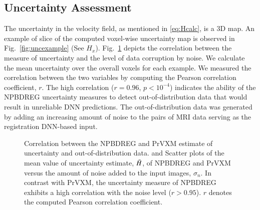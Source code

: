 \documentclass[preprint,authoryear]{elsarticle}
\begin{document}
\subsection{Uncertainty Assessment}
 The uncertainty in the velocity field, as mentioned in \eqref{eq:Hcalc}, is a 3D map. An example of slice of the computed voxel-wise uncertainty map is observed in Fig.~\ref{fig:uncexample} (See $H_x$). Fig.~\ref{fig:unccornoise} depicts the correlation between the measure of uncertainty and the level of data corruption by noise. We calculate the mean uncertainty over the overall voxels for each example. We measured the correlation between the two variables by computing the Pearson correlation coefficient, $r$. The high correlation ($r=0.96$, $p<10^{-4}$) indicates the ability of the NPBDREG uncertainty measures to detect out-of-distribution data that would result in unreliable DNN predictions. The out-of-distribution data was generated by adding an increasing amount of noise to the pairs of MRI data serving as the registration DNN-based input.
\begin{figure}[t!]
	\begin{minipage}[b]{0.45\linewidth}
		\centering
	\end{minipage}
	\begin{minipage}[b]{0.45\linewidth}
	
		\centering
	\end{minipage}	
	\caption{Correlation between the NPBDREG and PrVXM estimate of uncertainty and out-of-distribution data. \protect{} and \protect{} Scatter plots of the mean value of uncertainty estimate, $\Bar{H}$, of NPBDREG and PrVXM versus the amount of noise added to the input images, $\sigma_n$. In contrast with PrVXM, the uncertainty measure of NPBDREG exhibits a high correlation with the noise level ($r>0.95$). $r$ denotes the computed Pearson correlation coefficient.  }\label{fig:unccornoise}	
\end{figure} 
\end{document}
